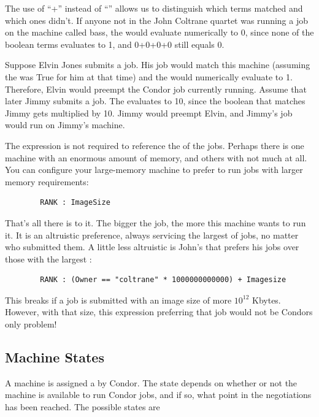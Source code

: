 The use of ``+'' instead of ``\Bar\Bar'' allows us to 
distinguish which terms matched and which ones didn't.
If anyone not in the John Coltrane quartet was running a job on
the machine called bass,
the  would evaluate numerically to 0, since none
of the boolean terms evaluates to 1, and 0+0+0+0 still equals 0.

Suppose Elvin Jones submits a job.
His job would match this
machine (assuming the  was True for him at that time) and
the  would numerically evaluate to 1.
Therefore, Elvin would preempt the Condor job currently running.
Assume that later Jimmy submits a job.
The  evaluates to 10, since the boolean that matches Jimmy
gets multiplied by 10.
Jimmy would preempt Elvin, and Jimmy's job would run on
Jimmy's machine.

The  expression is not required to reference the
 of the jobs.
Perhaps there is one machine with an enormous amount of memory,
and others with not much at all.
You can configure your
large-memory machine to prefer to run jobs with larger memory
requirements:
\begin{verbatim}
        RANK : ImageSize
\end{verbatim}

That's all there is to it.
The bigger the job, the more this machine
wants to run it.
It is an altruistic preference, always servicing
the largest of jobs, no matter who submitted them.
A little less altruistic is John's  that
prefers his jobs over those with the largest
:
\begin{verbatim}
        RANK : (Owner == "coltrane" * 1000000000000) + Imagesize
\end{verbatim}
This  breaks if a job is submitted with an image
size of more $10^{12}$ Kbytes.
However, with that size, this  expression
preferring that job would not be Condors
only problem! 

\subsection{\label{sec:States}
Machine States}

A machine is assigned a  by Condor.
The state
depends on whether or not the machine is available to run Condor
jobs, and if so, what point in the negotiations has been reached.
The possible states are

